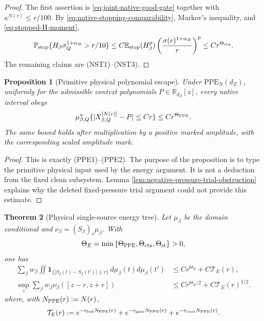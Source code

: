 \documentclass[11pt]{article}
\newtheorem{theorem}{Theorem}[section]
\newtheorem{proposition}[theorem]{Proposition}
\begin{document}
\begin{proof}
The first assertion is \eqref{eq:joint-native-good-gate} together with
$\kappa^{N(r)}\le r/100$.  By
\eqref{eq:native-stopping-comparability}, Markov's inequality, and
\eqref{eq:stopped-H-moment},
\[
 \mathbb P_{\rm stop}\{H_\beta\sigma_Q^{1+\alpha_B}>r/10\}
 \le C\mathbb E_{\rm stop}(H_\beta^p)
 \left(\frac{\sigma(r)^{1+\alpha_B}}r\right)^p
 \le Cr^{\Theta_{\rm ctx}}.
\]
The remaining claims are \textup{(NST1)--(NST3)}.
\end{proof}

\begin{proposition}[Primitive physical polynomial escape]
\label{prop:physical-legal-child}
Under $\mathrm{PPE}_{N}(d_Z)$, uniformly for the admissible context
polynomials $P\in\mathbb R_{d_Z}[z]$, every native interval obeys
\begin{equation}
\label{eq:local-clean-sublevel}
 \mu^u_{\beta,Q}
 \{|X^{[N(r)]}_{\beta,Q}-P|\le Cr\}
 \le Cr^{\Theta_{\rm PPE}}.
\end{equation}
The same bound holds after multiplication by a positive marked amplitude,
with the corresponding scaled amplitude mark.
\end{proposition}

\begin{proof}
This is exactly \textup{(PPE1)--(PPE2)}.  The purpose of the proposition is
to type the primitive physical input used by the energy argument.  It is not
a deduction from the fixed clean subsystem.  Lemma
\ref{lem:negative-pressure-trial-obstruction} explains why the deleted
fixed-pressure trial argument could not provide this estimate.
\end{proof}

\begin{theorem}[Physical single-source energy tree]
\label{thm:direct-slope-small-ball}
Let $\mu_\beta$ be the domain conditional and
$\nu_\beta=(S_\beta)_*\mu_\beta$.  With
\begin{equation}
\label{eq:physical-energy-exponent}
 \Theta_E=\min\left\{\Theta_{\rm PPE},
        \Theta_{\rm ctx},\Theta_{\rm st}\right\}>0,
\end{equation}
one has
\begin{align}
 \sum_\beta w_\beta\iint
   \mathbf 1_{\{|S_\beta(t)-S_\beta(t')|\le r\}}
   \,d\mu_\beta(t)d\mu_\beta(t')
 &\le Cr^{\Theta_E}+C\mathcal T_E(r),\label{eq:conditional-energy-bound}\\
 \sup_z\sum_\beta w_\beta\nu_\beta([z-r,z+r])
 &\le Cr^{\Theta_E/2}+C\mathcal T_E(r)^{1/2}.
 \label{eq:slope-value-small-ball}
\end{align}
where, with $N_{\rm PPE}(r):=N(r)$,
\begin{equation}
\label{eq:complete-energy-tail}
 \mathcal T_E(r):=
 e^{-c_{\rm buf}N_{\rm PPE}(r)}
 +e^{-c_{\rm gate}N_{\rm PPE}(r)}
 +e^{-c_{\rm cont}N_{\rm PPE}(r)}.
\end{equation}
\end{theorem}
\end{document}
